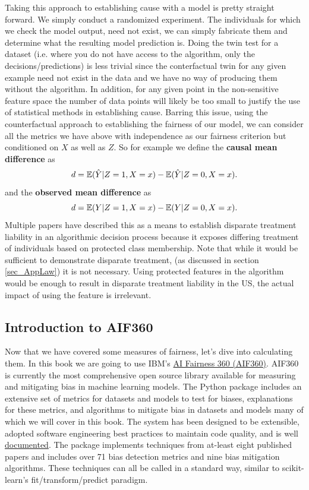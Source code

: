 Taking this approach to establishing cause with a model is pretty straight forward. We simply conduct a randomized experiment. The individuals for which we check the model output, need not exist, we can simply fabricate them and determine what the resulting model prediction is. Doing the twin test for a dataset (i.e. where you do not have access to the algorithm, only the decisions/predictions) is less trivial since the conterfactual twin for any given example need not exist in the data and we have no way of producing them without the algorithm. In addition, for any given point in the non-sensitive feature space the number of data points will likely be too small to justify the use of statistical methods in establishing cause. Barring this issue, using the counterfactual approach to establishing the fairness of our model, we can consider all the metrics we have above with independence as our fairness criterion but conditioned on $X$ as well as $Z$. So for example we define the \textbf{causal mean difference} as 
\[
d = \mathbb{E}(\hat{Y} | Z=1, X=x) - \mathbb{E}(\hat{Y} | Z=0, X=x).
\]
and the \textbf{observed mean difference} as
\[
d = \mathbb{E}(Y | Z=1, X=x) - \mathbb{E}(Y | Z=0, X=x).
\]
Multiple papers have described this as a means to establish disparate treatment liability in an algorithmic decision process because it exposes differing treatment of individuals based on protected class membership. Note that while it would be sufficient to demonstrate disparate treatment, (as discussed in section \ref{sec_AppLaw}) it is not necessary. Using protected features in the algorithm would be enough to result in disparate treatment liability in the US, the actual impact of using the feature is irrelevant.

\subsection{Introduction to AIF360}

Now that we have covered some measures of fairness, let's dive into calculating them. In this book we are going to use IBM's \href{https://aif360.mybluemix.net/resources}{AI Fairness 360 (AIF360)}. AIF360 is currently the most comprehensive open source library available for measuring and mitigating bias in machine learning models. The Python package includes an extensive set of metrics for datasets and models to test for biases, explanations for these metrics, and algorithms to mitigate bias in datasets and models many of which we will cover in this book. The system has been designed to be extensible, adopted software engineering best practices to maintain code quality, and is well \href{https://aif360.readthedocs.io/en/latest/index.html}{documented}. The package implements techniques from at-least eight published papers and includes over 71 bias detection metrics and nine bias mitigation algorithms\cite{AIF360}. These techniques can all be called in a standard way, similar to scikit-learn’s fit/transform/predict paradigm.


